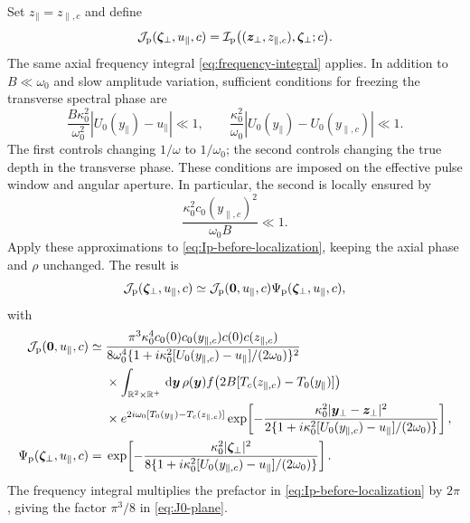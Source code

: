 \documentclass[11pt]{article}
\newcommand{\R}{\mathbb{R}}
\newcommand{\by}{\bm{y}}
\newcommand{\bz}{\bm{z}}
\newcommand{\bzeta}{\boldsymbol{\zeta}}
\newcommand{\dd}{\,\mathrm{d}}
\begin{document}
Set $z_\parallel=z_{\parallel,c}$ and define
\begin{equation}
\mathcal J_{\rm p}(\bzeta_\perp,u_\parallel,c)
=\mathcal I_{\rm p}\big((\bz_\perp,z_{\parallel,c}),\bzeta_\perp;c\big).
\end{equation}
The same axial frequency integral \eqref{eq:frequency-integral} applies.
In addition to $B\ll\omega_0$ and slow amplitude variation, sufficient
conditions for freezing the transverse spectral phase are
\begin{equation}
\frac{B\kappa_0^2}{\omega_0^2}
|U_0(y_\parallel)-u_\parallel|\ll1,
\qquad
\frac{\kappa_0^2}{\omega_0}
|U_0(y_\parallel)-U_0(y_{\parallel,c})|\ll1.
\label{eq:plane-freezing}
\end{equation}
The first controls changing $1/\omega$ to $1/\omega_0$; the second
controls changing the true depth in the transverse phase. These
conditions are imposed on the effective pulse window and angular
aperture. In particular, the second is locally ensured by
\begin{equation}
\frac{\kappa_0^2c_0(y_{\parallel,c})^2}{\omega_0B}\ll1.
\end{equation}
Apply these approximations to \eqref{eq:Ip-before-localization}, keeping
the axial phase and $\rho$ unchanged. The result is
\begin{equation}
\mathcal J_{\rm p}(\bzeta_\perp,u_\parallel,c)
\simeq\mathcal J_{\rm p}(\mathbf0,u_\parallel,c)
\Psi_{\rm p}(\bzeta_\perp,u_\parallel,c),
\label{eq:factor-plane}
\end{equation}
with
\begin{align}
\mathcal J_{\rm p}(\mathbf0,u_\parallel,c)
\simeq{}&
\frac{\pi^3\kappa_0^4c_0(0)c_0(y_{\parallel,c})c(0)c(z_{\parallel,c})}
{8\omega_0^4
\{1+i\kappa_0^2[U_0(y_{\parallel,c})-u_\parallel]/(2\omega_0)\}^2}
\nonumber\\
&\times\int_{\R^2\times\R^+}\dd\by\,\rho(\by)
f\!\left(2B[T_c(z_{\parallel,c})-T_0(y_\parallel)]\right)
\nonumber\\
&\times e^{2i\omega_0[T_0(y_\parallel)-T_c(z_{\parallel,c})]}
\exp\!\left[-\frac{\kappa_0^2|\by_\perp-\bz_\perp|^2}
{2\{1+i\kappa_0^2[U_0(y_{\parallel,c})-u_\parallel]/(2\omega_0)\}}\right],
\label{eq:J0-plane}\\
\Psi_{\rm p}(\bzeta_\perp,u_\parallel,c)
={}&\exp\!\left[-\frac{\kappa_0^2|\bzeta_\perp|^2}
{8\{1+i\kappa_0^2[U_0(y_{\parallel,c})-u_\parallel]/(2\omega_0)\}}\right].
\label{eq:Psi-plane-complex}
\end{align}
The frequency integral multiplies the prefactor in
\eqref{eq:Ip-before-localization} by $2\pi$, giving the factor
$\pi^3/8$ in \eqref{eq:J0-plane}.
\end{document}
